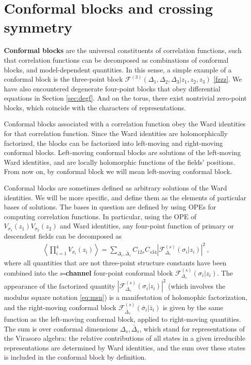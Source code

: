 \documentclass[12pt, a4paper, notitlepage, twoside]{report}
\numberwithin{equation}{section}
\theoremstyle{break}
\begin{document}
\section{Conformal blocks and crossing symmetry \label{secaco}}

\textbf{\boldmath Conformal blocks} are the universal constituents of correlation functions, such that correlation functions can be decomposed as combinations of conformal blocks, and model-dependent quantities.
In this sense, a simple example of a conformal block is the three-point block $\mathcal{F}^{(3)}(\Delta_1,\Delta_2,\Delta_3|z_1,z_2,z_3)$ \eqref{fzzz}. 
We have also encountered degenerate four-point blocks that obey differential equations in Section \ref{sec:degf}.
And on the torus, there exist nontrivial zero-point blocks, which coincide with the characters of representations. 

Conformal blocks associated with a correlation function obey the Ward identities for that correlation function. 
Since the Ward identities are holomorphically factorized, the blocks can be factorized into left-moving and right-moving conformal blocks. Left-moving conformal blocks are solutions of the left-moving Ward identities, and are locally holomorphic functions of the fields' positions. From now on, by conformal block we will mean left-moving conformal block. 

Conformal blocks are sometimes defined as arbitrary solutions of the Ward identities. We will be more specific, and define them as the elements of particular bases of solutions. The bases in question are defined by using OPEs for computing correlation functions. In particular, using the OPE of $V_{\sigma_1}(z_1)V_{\sigma_2}(z_2)$ and Ward identities, any four-point function of primary or descendent fields can be decomposed as 
\begin{align}
 \left\langle \prod_{i=1}^4 V_{\sigma_i}(z_i)\right\rangle 
 = \sum_{\Delta_s,\bar{\Delta}_s} C_{12s} C_{s34} \left| \mathcal{F}^{(s)}_{\Delta_s}(\sigma_i|z_i)\right|^2\ ,
\label{fsd}
\end{align}
where all quantities that are not three-point structure constants have been combined into the \textbf{\boldmath $s$-channel} four-point conformal block $\mathcal{F}^{(s)}_{\Delta_s}(\sigma_i|z_i)$.
The appearance of the factorized quantity $\left| \mathcal{F}^{(s)}_{\Delta_s}(\sigma_i|z_i)\right|^2 $ (which involves the modulus square notation \eqref{eq:msn}) is a manifestation of holomophic factorization, and the right-moving conformal block $\mathcal{F}^{(s)}_{\bar\Delta_s}(\bar\sigma_i|\bar z_i)$ is given by the same function as the left-moving conformal block, applied to right-moving quantities. The sum is over conformal dimensions $\Delta_s,\bar{\Delta}_s$, which stand for representations of the Virasoro algebra: the relative contributions of all states in a given irreducible representations are determined by Ward identities, and the sum over these states is included in the conformal block by definition.
\end{document}
